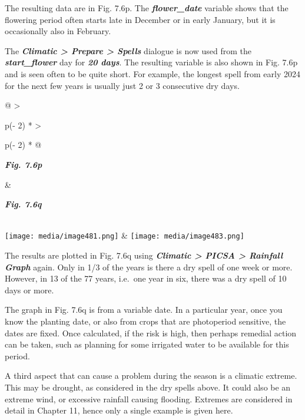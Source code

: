 \documentclass[
  letterpaper,
  DIV=11,
  numbers=noendperiod]{scrreprt}
\begin{document}
The resulting data are in Fig. 7.6p. The \textbf{\emph{flower\_date}}
variable shows that the flowering period often starts late in December
or in early January, but it is occasionally also in February.

The \textbf{\emph{Climatic \textgreater{} Prepare \textgreater{}
Spells}} dialogue is now used from the \textbf{\emph{start\_flower}} day
for \textbf{\emph{20 days}}. The resulting variable is also shown in
Fig. 7.6p and is seen often to be quite short. For example, the longest
spell from early 2024 for the next few years is usually just 2 or 3
consecutive dry days.

\begin{longtable}[]{@{}
  >{\raggedright\arraybackslash}p{(\columnwidth - 2\tabcolsep) * }
  >{\raggedright\arraybackslash}p{(\columnwidth - 2\tabcolsep) * }@{}}
\toprule\noalign{}
\begin{minipage}[b]{\linewidth}\raggedright
\textbf{\emph{Fig. 7.6p}}
\end{minipage} & \begin{minipage}[b]{\linewidth}\raggedright
\textbf{\emph{Fig. 7.6q}}
\end{minipage} \\
\midrule\noalign{}
\endhead
\bottomrule\noalign{}
\endlastfoot
\texttt{[image: media/image481.png]} &
\texttt{[image: media/image483.png]} \\
\end{longtable}

The results are plotted in Fig. 7.6q using \textbf{\emph{Climatic
\textgreater{} PICSA \textgreater{} Rainfall Graph}} again. Only in 1/3
of the years is there a dry spell of one week or more. However, in 13 of
the 77 years, i.e.~one year in six, there was a dry spell of 10 days or
more.

The graph in Fig. 7.6q is from a variable date. In a particular year,
once you know the planting date, or also from crops that are photoperiod
sensitive, the dates are fixed. Once calculated, if the risk is high,
then perhaps remedial action can be taken, such as planning for some
irrigated water to be available for this period.

A third aspect that can cause a problem during the season is a climatic
extreme. This may be drought, as considered in the dry spells above. It
could also be an extreme wind, or excessive rainfall causing flooding.
Extremes are considered in detail in Chapter 11, hence only a single
example is given here.
\end{document}
